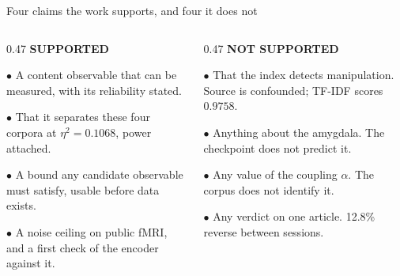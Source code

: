 \documentclass[aspectratio=169,11pt]{beamer}
\begin{document}
\begin{frame}{Four claims the work supports, and four it does not}
\vspace{0.7em}
\begin{columns}[T]
\begin{column}{0.47\textwidth}
{\color{navy}\bfseries SUPPORTED}
\vspace{0.8em}

{\small
$\bullet$\; A content observable that can be measured, with its reliability stated.

\vspace{0.6em}
$\bullet$\; That it separates these four corpora at $\eta^2 = 0.1068$, power attached.

\vspace{0.6em}
$\bullet$\; A bound any candidate observable must satisfy, usable before data exists.

\vspace{0.6em}
$\bullet$\; A noise ceiling on public fMRI, and a first check of the encoder against it.
}
\end{column}
\begin{column}{0.47\textwidth}
{\color{ember}\bfseries NOT SUPPORTED}
\vspace{0.8em}

{\small
$\bullet$\; That the index detects manipulation. Source is confounded; TF-IDF scores $0.9758$.

\vspace{0.6em}
$\bullet$\; Anything about the amygdala. The checkpoint does not predict it.

\vspace{0.6em}
$\bullet$\; Any value of the coupling $\alpha$. The corpus does not identify it.

\vspace{0.6em}
$\bullet$\; Any verdict on one article. 12.8\% reverse between sessions.
}
\end{column}
\end{columns}
\end{frame}
\end{document}
